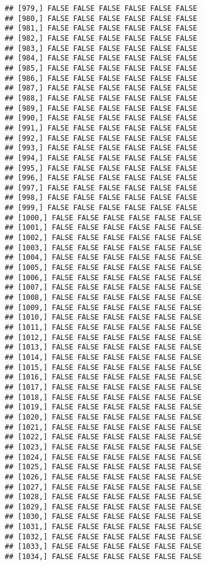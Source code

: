 \documentclass[
]{article}
\begin{document}
\begin{verbatim}
## [979,] FALSE FALSE FALSE FALSE FALSE FALSE
## [980,] FALSE FALSE FALSE FALSE FALSE FALSE
## [981,] FALSE FALSE FALSE FALSE FALSE FALSE
## [982,] FALSE FALSE FALSE FALSE FALSE FALSE
## [983,] FALSE FALSE FALSE FALSE FALSE FALSE
## [984,] FALSE FALSE FALSE FALSE FALSE FALSE
## [985,] FALSE FALSE FALSE FALSE FALSE FALSE
## [986,] FALSE FALSE FALSE FALSE FALSE FALSE
## [987,] FALSE FALSE FALSE FALSE FALSE FALSE
## [988,] FALSE FALSE FALSE FALSE FALSE FALSE
## [989,] FALSE FALSE FALSE FALSE FALSE FALSE
## [990,] FALSE FALSE FALSE FALSE FALSE FALSE
## [991,] FALSE FALSE FALSE FALSE FALSE FALSE
## [992,] FALSE FALSE FALSE FALSE FALSE FALSE
## [993,] FALSE FALSE FALSE FALSE FALSE FALSE
## [994,] FALSE FALSE FALSE FALSE FALSE FALSE
## [995,] FALSE FALSE FALSE FALSE FALSE FALSE
## [996,] FALSE FALSE FALSE FALSE FALSE FALSE
## [997,] FALSE FALSE FALSE FALSE FALSE FALSE
## [998,] FALSE FALSE FALSE FALSE FALSE FALSE
## [999,] FALSE FALSE FALSE FALSE FALSE FALSE
## [1000,] FALSE FALSE FALSE FALSE FALSE FALSE
## [1001,] FALSE FALSE FALSE FALSE FALSE FALSE
## [1002,] FALSE FALSE FALSE FALSE FALSE FALSE
## [1003,] FALSE FALSE FALSE FALSE FALSE FALSE
## [1004,] FALSE FALSE FALSE FALSE FALSE FALSE
## [1005,] FALSE FALSE FALSE FALSE FALSE FALSE
## [1006,] FALSE FALSE FALSE FALSE FALSE FALSE
## [1007,] FALSE FALSE FALSE FALSE FALSE FALSE
## [1008,] FALSE FALSE FALSE FALSE FALSE FALSE
## [1009,] FALSE FALSE FALSE FALSE FALSE FALSE
## [1010,] FALSE FALSE FALSE FALSE FALSE FALSE
## [1011,] FALSE FALSE FALSE FALSE FALSE FALSE
## [1012,] FALSE FALSE FALSE FALSE FALSE FALSE
## [1013,] FALSE FALSE FALSE FALSE FALSE FALSE
## [1014,] FALSE FALSE FALSE FALSE FALSE FALSE
## [1015,] FALSE FALSE FALSE FALSE FALSE FALSE
## [1016,] FALSE FALSE FALSE FALSE FALSE FALSE
## [1017,] FALSE FALSE FALSE FALSE FALSE FALSE
## [1018,] FALSE FALSE FALSE FALSE FALSE FALSE
## [1019,] FALSE FALSE FALSE FALSE FALSE FALSE
## [1020,] FALSE FALSE FALSE FALSE FALSE FALSE
## [1021,] FALSE FALSE FALSE FALSE FALSE FALSE
## [1022,] FALSE FALSE FALSE FALSE FALSE FALSE
## [1023,] FALSE FALSE FALSE FALSE FALSE FALSE
## [1024,] FALSE FALSE FALSE FALSE FALSE FALSE
## [1025,] FALSE FALSE FALSE FALSE FALSE FALSE
## [1026,] FALSE FALSE FALSE FALSE FALSE FALSE
## [1027,] FALSE FALSE FALSE FALSE FALSE FALSE
## [1028,] FALSE FALSE FALSE FALSE FALSE FALSE
## [1029,] FALSE FALSE FALSE FALSE FALSE FALSE
## [1030,] FALSE FALSE FALSE FALSE FALSE FALSE
## [1031,] FALSE FALSE FALSE FALSE FALSE FALSE
## [1032,] FALSE FALSE FALSE FALSE FALSE FALSE
## [1033,] FALSE FALSE FALSE FALSE FALSE FALSE
## [1034,] FALSE FALSE FALSE FALSE FALSE FALSE

\end{verbatim}
\end{document}
